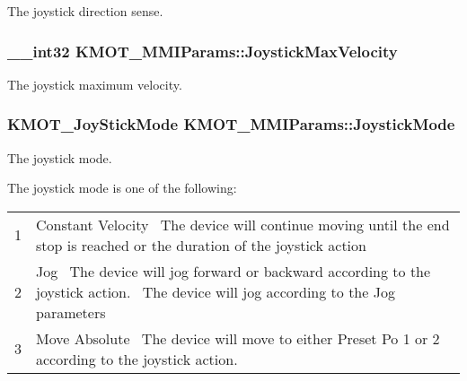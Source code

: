 The joystick direction sense. 

\subsubsection[{\texorpdfstring{Joystick\+Max\+Velocity}{JoystickMaxVelocity}}]{\setlength{\rightskip}{0pt plus 5cm}\+\_\+\+\_\+int32 K\+M\+O\+T\+\_\+\+M\+M\+I\+Params\+::\+Joystick\+Max\+Velocity}\hypertarget{struct_k_m_o_t___m_m_i_params_a3b03707b326d8968f146bfa0c7219148}{}\label{struct_k_m_o_t___m_m_i_params_a3b03707b326d8968f146bfa0c7219148}


The joystick maximum velocity. 

\subsubsection[{\texorpdfstring{Joystick\+Mode}{JoystickMode}}]{\setlength{\rightskip}{0pt plus 5cm}K\+M\+O\+T\+\_\+\+Joy\+Stick\+Mode K\+M\+O\+T\+\_\+\+M\+M\+I\+Params\+::\+Joystick\+Mode}\hypertarget{struct_k_m_o_t___m_m_i_params_aefe0bf399db7c10d4b35739fd2428183}{}\label{struct_k_m_o_t___m_m_i_params_aefe0bf399db7c10d4b35739fd2428183}


The joystick mode. 

The joystick mode is one of the following\+: \tabulinesep=1mm
\begin{longtabu} spread 0pt [c]{*2{|X[-1]}|}
&Constant Velocity~\newline
The device will continue moving until the end stop is reached or the duration of the joystick action \\
2&Jog~\newline
The device will jog forward or backward according to the joystick action.~\newline
 The device will jog according to the Jog parameters \\
3&Move Absolute~\newline
The device will move to either Preset Po 1 or 2 according to the joystick action. \\
\end{longtabu}
